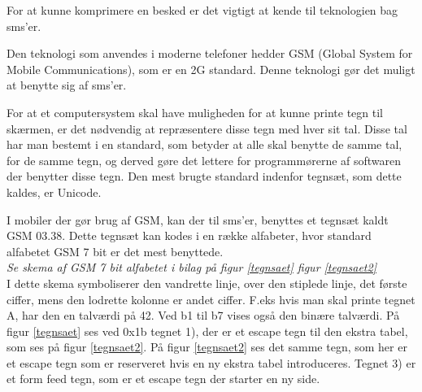 For at kunne komprimere en besked er det vigtigt at kende til teknologien bag sms'er.

Den teknologi som anvendes i moderne telefoner hedder GSM (Global System for Mobile Communications), som er en 2G standard. Denne teknologi gør det muligt at benytte sig af sms'er.\cite{GSM_term}

For at et computersystem skal have muligheden for at kunne printe tegn til skærmen, er det nødvendig at repræsentere disse tegn med hver sit tal. Disse tal har man bestemt i en standard, som betyder at alle skal benytte de samme tal, for de samme tegn, og derved gøre det lettere for programmørerne af softwaren der benytter disse tegn. Den mest brugte standard indenfor tegnsæt, som dette kaldes, er Unicode.\cite{UNICODE_standard}

I mobiler der gør brug af GSM, kan der til sms'er, benyttes et tegnsæt kaldt GSM 03.38. Dette tegnsæt kan kodes i en række alfabeter, hvor standard alfabetet GSM 7 bit er det mest benyttede.
\\
\emph {Se skema af GSM 7 bit alfabetet i  bilag på figur \ref{tegnsaet} figur \ref{tegnsaet2}}
\\
I dette skema symboliserer den vandrette linje, over den stiplede linje, det første ciffer, mens den lodrette kolonne er andet ciffer. F.eks hvis man skal printe tegnet A, har den en talværdi på 42. Ved b1 til b7 vises også den binære talværdi.
På figur \ref{tegnsaet} ses ved 0x1b tegnet 1), der er et escape tegn til den ekstra tabel, som ses på figur \ref{tegnsaet2}. På figur \ref{tegnsaet2} ses det samme tegn, som her er et escape tegn som er reserveret hvis en ny ekstra tabel introduceres. Tegnet 3) er et form feed tegn, som er et escape tegn der starter en ny side.\cite{GSM_7_bit}
